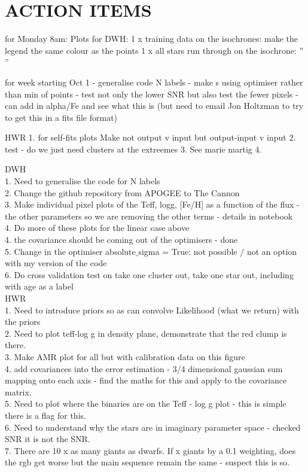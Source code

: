 \documentclass[12pt, preprint]{aastex}
\begin{document}
\section{ACTION ITEMS}

for Monday 8am:
Plots for DWH: 
1 x training data on the isochrones: make the legend the same colour as the points
1 x all stars run through on the isochrone: '' '' 

for week starting Oct 1 
- generalise code N labels
- make s using optimiser rather than min of points 
- test not only the lower SNR but also test the fewer pixels 
- can add in alpha/Fe and see what this is (but need to email Jon Holtzman to try to get this in a fits file format) 

HWR
1. for self-fits plots Make not output v input but output-input v input
2. test - do we just need clusters at the extreemes
3. See marie martig
4. 



DWH\\
 
1. Need to generalise the code for N labels\\
2. Change the github repository from APOGEE to The Cannon\\
3. Make individual pixel plots of the Teff, logg, [Fe/H] as a function of the flux - the other parameters so we are removing the other terms - details in notebook\\
4. Do more of these plots for the linear case above\\
4. the covariance should be coming out of the optimisers - done\\
5. Change in the optimiser absolute$\_$sigma = True: not possible $/$ not an option with my version of the code\\
6. Do cross validation test on take one cluster out, take one star out, including with age as a label\\

HWR \\
1. Need to introduce priors so as can convolve Likelihood (what we return) with the priors\\
2. Need to plot teff-log g in density plane, demonstrate that the red clump is there.\\
3. Make AMR plot for all but with calibration data on this figure\\
4. add covariances into the error estimation - 3/4 dimensional gaussian sum mapping onto each axis - find the maths for this and apply to the covariance matrix.\\
5. Need to plot where the binaries are on the Teff - log g plot - this is simple there is a flag for this.\\
6. Need to understand why the stars are in imaginary parameter space - checked SNR it is not the SNR.\\
7. There are 10 x as many giants as dwarfs. If x giants by a 0.1 weighting, does the rgb get worse but the main sequence remain the same - suspect this is so.\\
\end{document}
